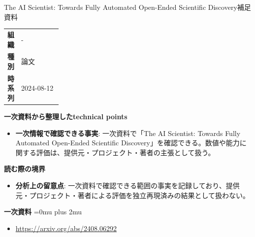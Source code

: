 \begin{technicalnote}{The AI Scientist: Towards Fully Automated Open-Ended Scientific Discovery}{補足資料}
\begingroup
\begin{tabularx}{\linewidth}{@{}>{\bfseries}p{0.22\linewidth}X@{}}
組織 & - \\
種別 & 論文 \\
時系列 & 2024-08-12 \\
\end{tabularx}
\smallskip
{\bfseries 一次資料から整理したtechnical points}
\begin{itemize}[leftmargin=1.5em,itemsep=0.35em]
\item \textbf{一次情報で確認できる事実}: 一次資料で「The AI Scientist: Towards Fully Automated Open-Ended Scientific Discovery」を確認できる。数値や能力に関する評価は、提供元・プロジェクト・著者の主張として扱う。
\end{itemize}
\begin{minipage}{\linewidth}
{\bfseries 読む際の境界}
\begin{itemize}[leftmargin=1.5em,itemsep=0.35em]
\item \textbf{分析上の留意点}: 一次資料で確認できる範囲の事実を記録しており、提供元・プロジェクト・著者による評価を独立再現済みの結果として扱わない。
\end{itemize}
\begin{samepage}
{\bfseries 一次資料}
\begingroup\sloppy
\Urlmuskip=0mu plus 2mu\relax
\begin{itemize}[leftmargin=1.5em,itemsep=0.25em]
\item {\scriptsize\url{https://arxiv.org/abs/2408.06292}}
\end{itemize}
\endgroup
\end{samepage}
\end{minipage}
\endgroup
\end{technicalnote}
\medskip
